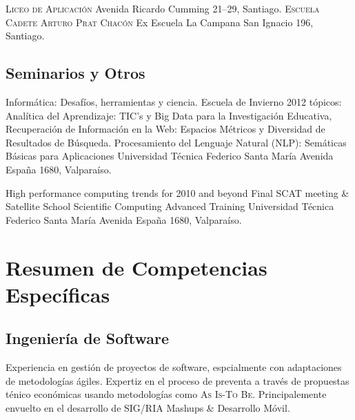 \documentclass[11pt,letterpaper,roman]{moderncv}
\begin{document}

 {\textsc{Liceo de Aplicaci\'on}} {} {} {} {Avenida
Ricardo Cumming 21--29, Santiago.}
 {\textsc{Escuela Cadete Arturo Prat Chac\'on}} {Ex
Escuela La Campana} {} {} {San Ignacio 196, Santiago.}

\subsection{Seminarios y Otros}

 {Informática: Desafíos, herramientas y ciencia.}
{Escuela de Invierno 2012} {tópicos: Analítica del Aprendizaje: TIC's y Big Data
para la Investigación Educativa, Recuperación de Información en la Web: Espacios
Métricos y Diversidad de Resultados de Búsqueda. Procesamiento del Lenguaje
Natural (NLP): Semáticas Básicas para Aplicaciones} {Universidad T\'ecnica
Federico Santa Mar\'ia} {Avenida España 1680, Valpara\'iso.}
	
	
 {High performance computing trends for 2010 and beyond}
{Final SCAT meeting \& Satellite School} {Scientific Computing Advanced
Training} {Universidad T\'ecnica Federico Santa Mar\'ia} {Avenida España 1680,
Valpara\'iso.}

%	
%	
%	
%
%	
\section{Resumen de Competencias Específicas} \subsection{Ingeniería de
Software}  {Experiencia
en gestión de proyectos de software, espcialmente con adaptaciones de
metodologías ágiles. Expertiz en el proceso de preventa a través de propuestas
ténico económicas usando metodologías como \textsc{As Is-To Be}. Principalemente
envuelto en el desarrollo de SIG/RIA Mashups \& Desarrollo Móvil.}
	
\end{document}
